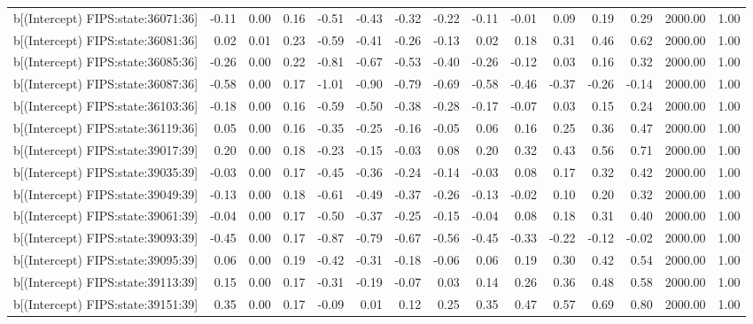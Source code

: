 \begin{table}[ht]
\begin{tabular}{rrrrrrrrrrrrrrr}
  b[(Intercept) FIPS:state:36071:36] & -0.11 & 0.00 & 0.16 & -0.51 & -0.43 & -0.32 & -0.22 & -0.11 & -0.01 & 0.09 & 0.19 & 0.29 & 2000.00 & 1.00 \\ 
  b[(Intercept) FIPS:state:36081:36] & 0.02 & 0.01 & 0.23 & -0.59 & -0.41 & -0.26 & -0.13 & 0.02 & 0.18 & 0.31 & 0.46 & 0.62 & 2000.00 & 1.00 \\ 
  b[(Intercept) FIPS:state:36085:36] & -0.26 & 0.00 & 0.22 & -0.81 & -0.67 & -0.53 & -0.40 & -0.26 & -0.12 & 0.03 & 0.16 & 0.32 & 2000.00 & 1.00 \\ 
  b[(Intercept) FIPS:state:36087:36] & -0.58 & 0.00 & 0.17 & -1.01 & -0.90 & -0.79 & -0.69 & -0.58 & -0.46 & -0.37 & -0.26 & -0.14 & 2000.00 & 1.00 \\ 
  b[(Intercept) FIPS:state:36103:36] & -0.18 & 0.00 & 0.16 & -0.59 & -0.50 & -0.38 & -0.28 & -0.17 & -0.07 & 0.03 & 0.15 & 0.24 & 2000.00 & 1.00 \\ 
  b[(Intercept) FIPS:state:36119:36] & 0.05 & 0.00 & 0.16 & -0.35 & -0.25 & -0.16 & -0.05 & 0.06 & 0.16 & 0.25 & 0.36 & 0.47 & 2000.00 & 1.00 \\ 
  b[(Intercept) FIPS:state:39017:39] & 0.20 & 0.00 & 0.18 & -0.23 & -0.15 & -0.03 & 0.08 & 0.20 & 0.32 & 0.43 & 0.56 & 0.71 & 2000.00 & 1.00 \\ 
  b[(Intercept) FIPS:state:39035:39] & -0.03 & 0.00 & 0.17 & -0.45 & -0.36 & -0.24 & -0.14 & -0.03 & 0.08 & 0.17 & 0.32 & 0.42 & 2000.00 & 1.00 \\ 
  b[(Intercept) FIPS:state:39049:39] & -0.13 & 0.00 & 0.18 & -0.61 & -0.49 & -0.37 & -0.26 & -0.13 & -0.02 & 0.10 & 0.20 & 0.32 & 2000.00 & 1.00 \\ 
  b[(Intercept) FIPS:state:39061:39] & -0.04 & 0.00 & 0.17 & -0.50 & -0.37 & -0.25 & -0.15 & -0.04 & 0.08 & 0.18 & 0.31 & 0.40 & 2000.00 & 1.00 \\ 
  b[(Intercept) FIPS:state:39093:39] & -0.45 & 0.00 & 0.17 & -0.87 & -0.79 & -0.67 & -0.56 & -0.45 & -0.33 & -0.22 & -0.12 & -0.02 & 2000.00 & 1.00 \\ 
  b[(Intercept) FIPS:state:39095:39] & 0.06 & 0.00 & 0.19 & -0.42 & -0.31 & -0.18 & -0.06 & 0.06 & 0.19 & 0.30 & 0.42 & 0.54 & 2000.00 & 1.00 \\ 
  b[(Intercept) FIPS:state:39113:39] & 0.15 & 0.00 & 0.17 & -0.31 & -0.19 & -0.07 & 0.03 & 0.14 & 0.26 & 0.36 & 0.48 & 0.58 & 2000.00 & 1.00 \\ 
  b[(Intercept) FIPS:state:39151:39] & 0.35 & 0.00 & 0.17 & -0.09 & 0.01 & 0.12 & 0.25 & 0.35 & 0.47 & 0.57 & 0.69 & 0.80 & 2000.00 & 1.00 \\ 

\end{tabular}
\end{table}

